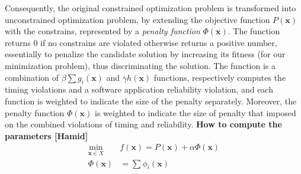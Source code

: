 Consequently, the original constrained optimization problem is transformed into unconstrained optimization problem, by extending the objective function $P(\textbf{x})$ with the constrains, represented by a \textit{penalty function} $\Phi(\textbf{x})$. The function returns 0 if no constrains are violated otherwise returns a positive number, essentially to penalize the candidate solution by increasing its fitness (for our minimization problem), thus discriminating the solution. The function is a combination of $\beta\sum{g_i(\textbf{x})}$ and $\gamma h(\textbf{x})$ functions, respectively computes the timing violations and a software application reliability violation, and each function is weighted to indicate the size of the penalty separately. Moreover, the penalty function $\Phi({\textbf{x}})$ is weighted to indicate the size of penalty that imposed on the combined violations of timing and reliability. \textbf{How to compute the parameters [Hamid]}
\begin{align}
\label{}
    \min_{\textbf{x}\in X}\;\;& f(\textbf{x})=P(\textbf{x}) + \alpha \Phi(\textbf{x})\\
    \label{eqn_penalityfunc}\Phi(\textbf{x}) &= \sum\phi_i(\textbf{x})
\end{align}


